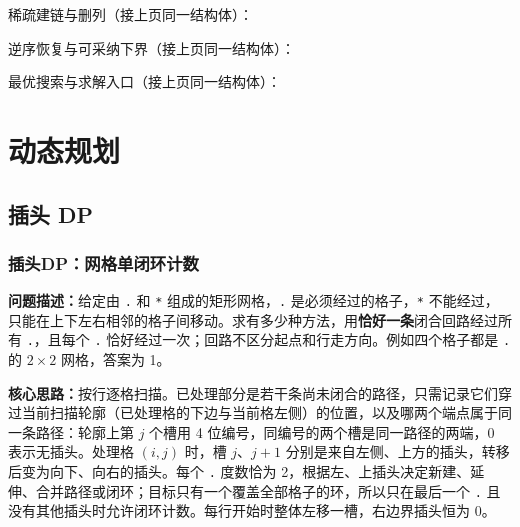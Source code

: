 \Needspace{387pt}



\newpage

\noindent 稀疏建链与删列（接上页同一结构体）：



\newpage

\noindent 逆序恢复与可采纳下界（接上页同一结构体）：



\newpage

\noindent 最优搜索与求解入口（接上页同一结构体）：



\part{动态规划}

\Needspace{180pt}

\chapter{插头 DP}

\section{插头DP：网格单闭环计数}\label{compact-grid_cycle}

\noindent\textbf{问题描述：}\allowbreak 给定由 \texttt{.} 和 \texttt{*} 组成的矩形网格，\texttt{.} 是必须经过的格子，\texttt{*} 不能经过，只能在上下左右相邻的格子间移动。求有多少种方法，用\textbf{恰好一条}闭合回路经过所有 \texttt{.}，且每个 \texttt{.} 恰好经过一次；回路不区分起点和行走方向。例如四个格子都是 \texttt{.} 的 $2\times2$ 网格，答案为 1。

\textbf{核心思路：}\allowbreak 按行逐格扫描。已处理部分是若干条尚未闭合的路径，只需记录它们穿过当前扫描轮廓（已处理格的下边与当前格左侧）的位置，以及哪两个端点属于同一条路径：轮廓上第 $j$ 个槽用 4 位编号，同编号的两个槽是同一路径的两端，0 表示无插头。处理格 $(i,j)$ 时，槽 $j$、$j+1$ 分别是来自左侧、上方的插头，转移后变为向下、向右的插头。每个 \texttt{.} 度数恰为 2，根据左、上插头决定新建、延伸、合并路径或闭环；目标只有一个覆盖全部格子的环，所以只在最后一个 \texttt{.} 且没有其他插头时允许闭环计数。每行开始时整体左移一槽，右边界插头恒为 0。

